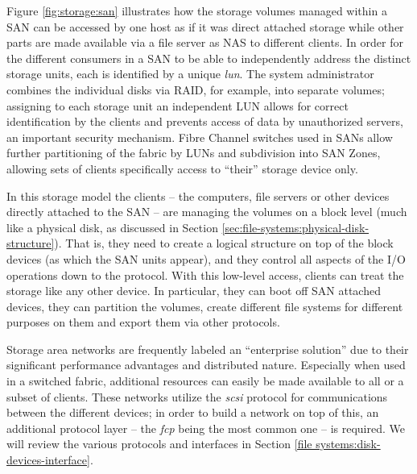 Figure \ref{fig:storage:san} illustrates how the
storage volumes managed within a SAN can be accessed
by one host as if it was direct attached storage while
other parts are made available via a file server as
NAS to different clients.  In order for the different
consumers in a SAN to be able to independently address
the distinct storage units, each is identified by a
unique {\em \gls{lun}}.  The system administrator
combines the individual disks via RAID, for example,
into separate volumes; assigning to each storage unit
an independent LUN allows for correct identification
by the clients and prevents access of data by
unauthorized servers, an important security mechanism.
Fibre Channel switches used in SANs allow further
partitioning of the fabric by LUNs and subdivision
into SAN Zones, allowing sets of
clients specifically access to ``their'' storage
device only.

In this storage model the clients -- the computers,
file servers or other devices directly attached to the
SAN -- are managing the volumes on a block level (much
like a physical disk, as discussed in Section
\ref{sec:file-systems:physical-disk-structure}).  That is,
they need to create a logical structure on top of the
block devices (as which the SAN units appear), and
they control all aspects of the I/O operations down to
the protocol.  With this low-level access, clients can
treat the storage like any other device.  In
particular, they can boot off SAN attached devices,
they can partition the volumes, create different file
systems for different purposes on them and export them
via other protocols.

Storage area networks are frequently labeled an
``enterprise solution'' due to their significant
performance advantages and distributed nature.
Especially when used in a switched fabric,
additional resources can easily be made available to
all or a subset of clients.  These networks utilize
the {\em \gls{scsi}} protocol for communications
between the different devices; in order to build a
network on top of this, an additional protocol layer
-- the {\em \gls{fcp}} being the most common
one -- is required. We will review the various
protocols and interfaces in Section \ref{file
systems:disk-devices-interface}.

